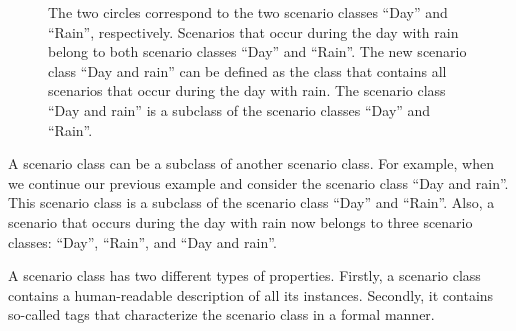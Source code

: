 \setlength{\venncircle}{7em}
\begin{figure}
	\centering
	\caption{The two circles correspond to the two scenario classes ``Day'' and ``Rain'', respectively. Scenarios that occur during the day with rain belong to both scenario classes ``Day'' and ``Rain''. The new scenario class ``Day and rain'' can be defined as the class that contains all scenarios that occur during the day with rain. The scenario class ``Day and rain'' is a subclass of the scenario classes ``Day'' and ``Rain''.}
	\label{fig:venn diagram scenario class}
\end{figure}

A scenario class can be a subclass of another scenario class. For example, when we continue our previous example and consider the scenario class ``Day and rain''. This scenario class is a subclass of the scenario class ``Day'' and ``Rain''. Also, a scenario that occurs during the day with rain now belongs to three scenario classes: ``Day'', ``Rain'', and ``Day and rain''.

A scenario class has two different types of properties. Firstly, a scenario class contains a human-readable description of all its instances. Secondly, it contains so-called tags that characterize the scenario class in a formal manner. 

\cbend

